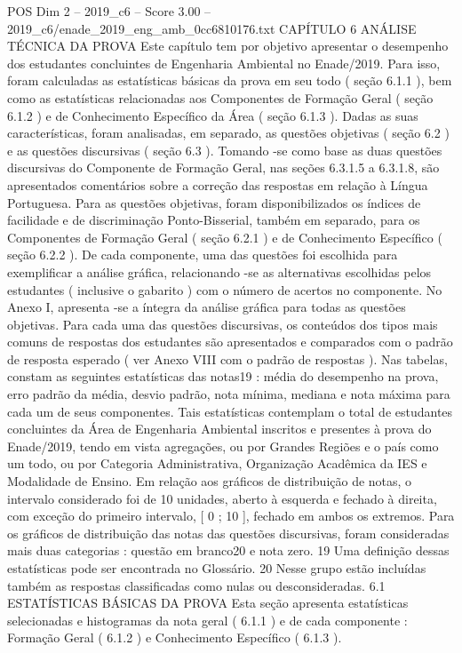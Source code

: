 \begin{textsample}{POS Dim 2 – 2019\_c6 – Score 3.00 – 2019\_c6/enade\_2019\_eng\_amb\_0cc6810176.txt}  \label{ex:f2_pos_158}
CAPÍTULO 6 ANÁLISE TÉCNICA DA PROVA Este capítulo tem por objetivo apresentar o desempenho dos estudantes concluintes de Engenharia Ambiental no Enade/2019.
Para isso, foram calculadas as estatísticas básicas da prova em seu todo ( seção 6.1.1 ), bem como as estatísticas relacionadas aos Componentes de Formação Geral ( seção 6.1.2 ) e de Conhecimento Específico da Área ( seção 6.1.3 ).
Dadas as suas características, foram analisadas, em separado, as questões objetivas ( seção 6.2 ) e as questões discursivas ( seção 6.3 ).
Tomando -se como base as duas questões discursivas do Componente de Formação Geral, nas seções 6.3.1.5 a 6.3.1.8, são apresentados comentários sobre a correção das respostas em relação à Língua Portuguesa.
Para as questões objetivas, foram disponibilizados os índices de facilidade e de discriminação Ponto-Bisserial, também em separado, para os Componentes de Formação Geral ( seção 6.2.1 ) e de Conhecimento Específico ( seção 6.2.2 ).
De cada componente, uma das questões foi escolhida para exemplificar a análise gráfica, relacionando -se as alternativas escolhidas pelos estudantes ( inclusive o gabarito ) com o número de acertos no componente.
No Anexo I, apresenta -se a íntegra da análise gráfica para todas as questões objetivas.
Para cada uma das questões discursivas, os conteúdos dos tipos mais comuns de respostas dos estudantes são apresentados e comparados com o padrão de resposta esperado ( ver Anexo VIII com o padrão de respostas ).
Nas tabelas, constam as seguintes estatísticas das notas19 : média do desempenho na prova, erro padrão da média, desvio padrão, nota mínima, mediana e nota máxima para cada um de seus componentes.
Tais estatísticas contemplam o total de estudantes concluintes da Área de Engenharia Ambiental inscritos e presentes à prova do Enade/2019, tendo em vista agregações, ou por Grandes Regiões e o país como um todo, ou por Categoria Administrativa, Organização Acadêmica da IES e Modalidade de Ensino.
Em relação aos gráficos de distribuição de notas, o intervalo considerado foi de 10 unidades, aberto à esquerda e fechado à direita, com exceção do primeiro intervalo, [ 0 ; 10 ], fechado em ambos os extremos.
Para os gráficos de distribuição das notas das questões discursivas, foram consideradas mais duas categorias : questão em branco20 e nota zero. 19 Uma definição dessas estatísticas pode ser encontrada no Glossário. 20 Nesse grupo estão incluídas também as respostas classificadas como nulas ou desconsideradas. 6.1 ESTATÍSTICAS BÁSICAS DA PROVA Esta seção apresenta estatísticas selecionadas e histogramas da nota geral ( 6.1.1 ) e de cada componente : Formação Geral ( 6.1.2 ) e Conhecimento Específico ( 6.1.3 ).

\end{textsample}
